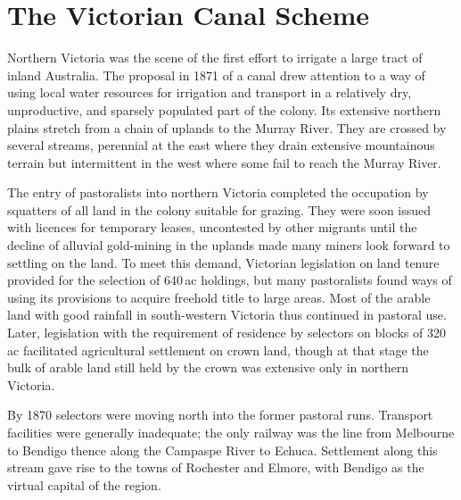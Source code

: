 \section*{The Victorian Canal Scheme}

Northern Victoria was the scene of the first effort to irrigate a
large tract of inland Australia.  The proposal in 1871 of a canal drew
attention to a way of using local water resources for irrigation and
transport in a relatively dry, unproductive, and sparsely populated
part of the colony.  Its extensive northern plains stretch from a
chain of uplands to the Murray River. They are crossed by several
streams, perennial at the east where they drain extensive mountainous
terrain but intermittent in the west where some fail to reach the
Murray River.

The entry of pastoralists into northern Victoria completed the
occupation by squatters of all land in the colony suitable for
grazing.  They were soon issued with licences for temporary leases,
uncontested by other migrants until the decline of alluvial
gold-mining in the uplands made many miners look forward to settling
on the land.  To meet this demand, Victorian legislation on land
tenure provided for the selection of 640\,ac holdings, but many
pastoralists found ways of using its provisions to acquire freehold
title to large areas.  Most of the arable land with good rainfall in
south-western Victoria thus continued in pastoral use. Later,
legislation with the requirement of residence by selectors on blocks
of 320\,ac facilitated agricultural settlement on crown land, though
at that stage the bulk of arable land still held by the crown was
extensive only in northern Victoria.

By 1870 selectors were moving north into the former pastoral runs.
Transport facilities were generally inadequate; the only railway was
the line from Melbourne to Bendigo thence along the Campaspe River to
Echuca.  Settlement along this stream gave rise to the towns of
Rochester and Elmore, with Bendigo as the virtual capital of the
region.

